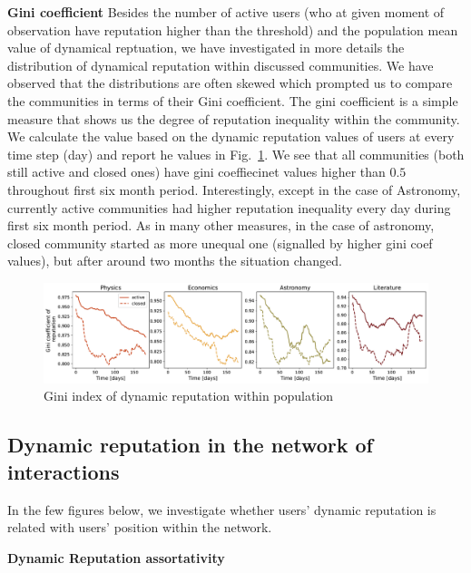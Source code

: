 \textbf{Gini coefficient}
Besides the number of active users (who at given moment of observation have reputation higher than the threshold) and the population mean value of dynamical reptuation, we have investigated in more details the distribution of dynamical reputation within discussed communities. We have observed that the distributions are often skewed which prompted us to compare the communities in terms of their Gini coefficient. The gini coefficient is a simple measure that shows us the degree of reputation inequality within the community. We calculate the value based on the dynamic reputation values of users at every time step (day) and report he values in Fig.~\ref{fig:dynrep-gini}. We see that all communities (both still active and closed ones) have gini coeffiecinet values higher than $0.5$ throughout first six month period. Interestingly, except in the case of Astronomy, currently active communities had higher reputation inequality every day during first six month period. As in many other measures, in the case of astronomy, closed community started as more unequal one (signalled by higher gini coef values), but after around two months the situation changed. 
\begin{figure}[h!]
	\centering
	\includegraphics[width=1\linewidth]{figures/stackexchange/gini.pdf}
	\caption{Gini index of dynamic reputation within population}
	\label{fig:dynrep-gini}
\end{figure}

\subsection{Dynamic reputation in the network of interactions}
In the few figures below, we investigate whether users' dynamic reputation is related with users' position within the network.

\textbf{Dynamic Reputation assortativity}

